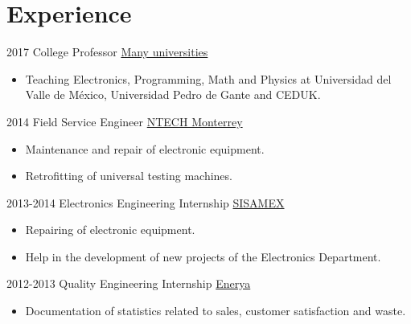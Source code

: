 \documentclass[letterpaper]{twentysecondcv} %
\begin{document}

\section{Experience}

\begin{twenty} %
    \twentyitem
    	{2017}
        {College Professor}
        {\href{}{Many universities}}
        {}
        {
        {\begin{itemize}
        \item Teaching Electronics, Programming, Math and Physics at Universidad del Valle de México, Universidad Pedro de Gante and CEDUK.
    \end{itemize}}
        }
        
	\twentyitem
    	{2014}
        {Field Service Engineer}
        {\href{http://www.ntech-mty.mx/}{NTECH Monterrey}}
        {}
        {
        {\begin{itemize}
        \item Maintenance and repair of electronic equipment.
        \item Retrofitting of universal testing machines.
    \end{itemize}}
        }
        
    \twentyitem
   		{2013-2014}
        {Electronics Engineering Internship}
        {\href{http://www.sisamex.com.mx/es/}{SISAMEX}}
        {}
        {
        {\begin{itemize}
        \item Repairing of electronic equipment.
        \item Help in the development of new projects of the Electronics Department.
    \end{itemize}}
        }
        
     \twentyitem
   		{2012-2013}
        {Quality Engineering Internship}
        {\href{http://www.grupogonher.com/empresas.html}{Enerya}}
        {}
        {
        \begin{itemize}
        \item Documentation of statistics related to sales, customer satisfaction and waste.
    \end{itemize}
    	}
        
\end{twenty}
\end{document}
